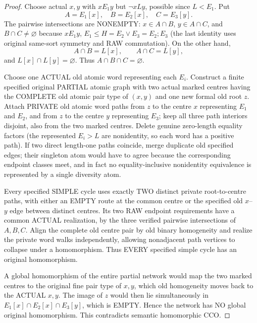 \begin{proof}
Choose actual $x,y$ with
$xE_1y$ but $\neg xLy$, possible
since $L<E_1$.  Put
\[
 A=E_1[x],\quad
 B=E_2[x],\quad
 C=E_3[y].
\]
The pairwise intersections are NONEMPTY:
$x\in A\cap B$,
$y\in A\cap C$, and
$B\cap C\ne\varnothing$ because
$xE_1y$, $E_1\le H=E_2\vee E_3
=E_2;E_3$ (the last identity uses
original same-sort symmetry and RAW
commutation).  On the other hand,
\[
           A\cap B=L[x],
           \qquad A\cap C=L[y],
\]
and $L[x]\cap L[y]=\varnothing$.
Thus $A\cap B\cap C=\varnothing$.

Choose one ACTUAL old atomic word
representing each $E_i$.  Construct
a finite specified original PARTIAL
atomic graph with two actual marked
centres having the COMPLETE old
atomic pair type of $(x,y)$
and one new formal old root $z$.
Attach PRIVATE old atomic word paths
from $z$ to the centre $x$
representing $E_1$ and $E_2$,
and from $z$ to the centre $y$
representing $E_3$; keep all
three path interiors disjoint,
also from the two marked centres.
Delete genuine zero-length
equality factors (the represented
$E_i>L$ are nonidentity, so
each word has a positive path).
If two direct length-one paths
coincide, merge duplicate old
specified edges; their singleton
atom would have to agree because
the corresponding endpoint classes
meet, and in fact no
equality-inclusive nonidentity
equivalence is represented by
a single diversity atom.

Every specified SIMPLE cycle
uses exactly TWO distinct private
root-to-centre paths, with either
an EMPTY route at the common
centre or the specified old
$x$--$y$ edge between distinct
centres. Its two RAW endpoint
requirements have a common
ACTUAL realization, by the
three verified pairwise
intersections of $A,B,C$.
Align the complete old centre
pair by old binary homogeneity
and realize the private word
walks independently, allowing
nonadjacent path vertices to
collapse under a homomorphism.
Thus EVERY specified simple cycle
has an original homomorphism.

A global homomorphism of the
entire partial network would
map the two marked centres to
the original fine pair type
of $x,y$, which old homogeneity
moves back to the ACTUAL
$x,y$. The image of $z$ would
then lie simultaneously in
$E_1[x]\cap E_2[x]\cap E_3[y]$,
which is EMPTY. Hence the
network has NO global original
homomorphism. This contradicts
semantic homomorphic CCO.
\end{proof}

